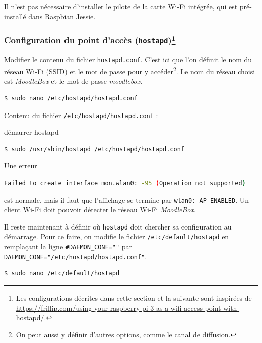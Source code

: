 \documentclass[11pt]{article}
\begin{document}
Il n'est pas nécessaire d'installer le pilote de la carte Wi-Fi intégrée, qui est pré-installé dans Raspbian Jessie.

\subsubsection[Configuration du point d'accès (\lstinline{hostapd})]{Configuration du point d'accès (\lstinline{hostapd})\footnote{Les configurations décrites dans cette section et la suivante sont inspirées de \url{https://frillip.com/using-your-raspberry-pi-3-as-a-wifi-access-point-with-hostapd/}.}}

Modifier le contenu du fichier \lstinline{hostapd.conf}. C'est ici que l'on définit le nom du réseau Wi-Fi (SSID) et le mot de passe pour y accéder\footnote{On peut aussi y définir d'autres options, comme le canal de diffusion.}. Le nom du réseau choisi est \emph{MoodleBox} et le mot de passe \emph{moodlebox}.

\begin{lstlisting}[language=bash]
$ sudo nano /etc/hostapd/hostapd.conf
\end{lstlisting}

Contenu du fichier \lstinline{/etc/hostapd/hostapd.conf} :



\begin{verification}
démarrer hostapd
\begin{lstlisting}[language=bash]
$ sudo /usr/sbin/hostapd /etc/hostapd/hostapd.conf
\end{lstlisting}

Une erreur
\begin{lstlisting}[language=bash]
Failed to create interface mon.wlan0: -95 (Operation not supported)
\end{lstlisting}
est normale, mais il faut que l'affichage se termine par \lstinline{wlan0: AP-ENABLED}. Un client Wi-Fi doit pouvoir détecter le réseau Wi-Fi \emph{MoodleBox}.
\end{verification}


Il reste maintenant à définir où \lstinline{hostapd} doit chercher sa configuration au démarrage. Pour ce faire, on modifie le fichier \lstinline{/etc/default/hostapd} en remplaçant la ligne \lstinline{#DAEMON_CONF=""} par \lstinline{DAEMON_CONF="/etc/hostapd/hostapd.conf"}.

\begin{lstlisting}[language=bash]
$ sudo nano /etc/default/hostapd
\end{lstlisting}
\end{document}
